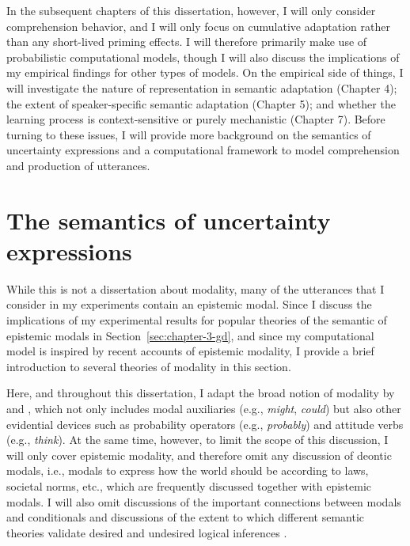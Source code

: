 In the subsequent chapters of this dissertation, however, I will only consider comprehension behavior, and I will only focus on cumulative adaptation
rather than any short-lived priming effects. I will therefore primarily make use of probabilistic computational models, though I will also discuss the implications
of my empirical findings for other types of models. On the empirical side of things, I will investigate the nature of representation in semantic adaptation (Chapter 4);
the extent of speaker-specific semantic adaptation (Chapter 5); and whether the learning process is context-sensitive or purely mechanistic (Chapter 7). Before turning to these
issues, I will provide more background on the semantics of uncertainty expressions and a computational framework to model comprehension and production of utterances.


\section{The semantics of uncertainty expressions}

While this is not a dissertation about modality, many of the utterances that I consider in my experiments contain an epistemic modal.
Since I discuss the implications of my experimental results for popular theories of the semantic of epistemic modals in Section~\ref{sec:chapter-3-gd}, and since 
my computational model is inspired by recent accounts of epistemic modality, I provide a brief introduction to several theories of modality in this section.

Here, and throughout this dissertation, I adapt the broad notion of modality by \cite{Portner2009} and \cite{Kratzer2012Ch2}, which not only 
includes modal auxiliaries (e.g., \textit{might}, \textit{could}) but also other evidential devices such as probability operators 
(e.g., \textit{probably}) and attitude verbs (e.g., \textit{think}). At the same time, however, to limit the scope of this discussion,  
I will only cover epistemic modality, and therefore omit any discussion of deontic modals, i.e., modals to express how the 
world should be according to laws, societal norms, etc., which are frequently discussed together with epistemic modals.
I will also omit discussions of the important connections between modals and conditionals \cite{see e.g., Lewis1973?,Kratzer1978,Kratzer1979,Kratzer2012}
and discussions of the extent to which different semantic theories validate desired and undesired logical inferences \cite{see e.g., Yalcin2010}.

